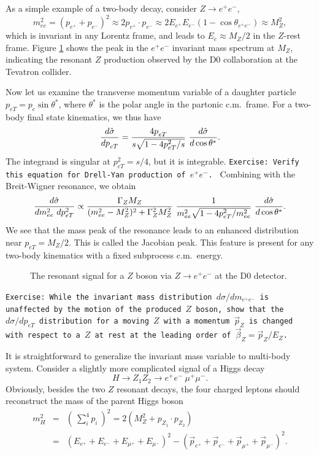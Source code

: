 \documentclass[12pt,prd,aps,floats,preprintnumbers,preprint,superscriptaddress,floatfix,nofootinbib]{revtex4}
\def\epem{e^+e^-}
\def\be{\begin{equation}}
\def\ee{\end{equation}}
\def\bea{\begin{eqnarray}}
\def\eea{\end{eqnarray}}
\begin{document}
As a simple example of a two-body decay, consider  $Z\to \epem$,
\be 
m_{ee}^2  = (p_{e^+} + p_{e^-})^2
\approx 2 p_{e^+} \cdot p_{e^-} \approx  2E_{e^+} E_{e^-} (1-\cos\theta_{\epem})
\approx M_Z^2,
\ee
which is invariant in any Lorentz frame, and leads to $E_e \approx M_Z/2$
in the $Z$-rest frame. Figure \ref{Zee} shows the peak 
in the $\epem$ invariant mass spectrum at $M_Z$, indicating the
resonant $Z$ production observed by the D0 collaboration \cite{d0} 
at the Tevatron collider.

Now let us examine the transverse momentum variable of a daughter
particle $p_{eT}^{}=p_e \sin\theta^*$, where $\theta^*$ is the polar angle
in the partonic c.m.~frame.  For a two-body final state kinematics, 
we thus have
\be
{d\hat\sigma\over dp_{eT}^{} } = {4p^{}_{eT} \over s \sqrt{1-4p_{eT}^2/s}}\ 
{d\hat\sigma\over d\cos\theta^* }.
\ee
The integrand is singular at  $p_{eT}^2 = s/4$, but it is integrable.
{
\vskip 0.2cm
\noindent
\tt Exercise: Verify this equation for  Drell-Yan production of $\epem$.
\vskip 0.2cm
}
\noindent
Combining with the Breit-Wigner resonance, we obtain
\be
{d\hat\sigma\over dm_{ee}^2\ dp_{eT}^2 } \propto
\frac{\Gamma_ZM_Z}{ (m^2_{ee}-M^2_Z)^2 + \Gamma_Z^2 M_Z^2}\ 
{1 \over m_{ee}^2\sqrt{1-4p_{eT}^2/m_{ee}^2}}\  {d\hat\sigma\over d\cos\theta^* }.
\ee
We see that the mass peak of the resonance leads to an enhanced
distribution near  $p_{eT}^{} = M_Z^{}/2$. This is called the Jacobian peak. 
This feature is present for any two-body kinematics with a fixed subprocess 
c.m.~energy. 

\begin{center}
\begin{figure}[tb]
\caption{The resonant signal for a $Z$ boson via $Z\to \epem$
at the D0 detector.}
\label{Zee}
\end{figure}
\end{center}

{
\vskip 0.2cm
\noindent
\tt Exercise: While the invariant mass distribution $d\sigma/dm_{\epem}$ is 
unaffected by the motion of the produced $Z$ boson, show that the 
$d\sigma/ dp_{eT}^{}$ distribution for a moving $Z$ with a momentum $\vec p_Z^{}$ is changed 
 with respect to a $Z$ at rest  at the leading order of $\vec \beta_Z^{} = \vec p_Z^{}/E_Z$.
\vskip 0.2cm
}

It is straightforward to generalize the invariant mass variable to multi-body
system. Consider a slightly more complicated signal of a Higgs decay
\be
H \to Z_1 Z_2 \to \epem\ \mu^+\mu^-.
\ee
Obviously, besides the two $Z$ resonant decays, the four charged
leptons should reconstruct the mass of the parent Higgs boson
\bea
m_H^2 &=& (\ \sum_i^4 p_{i} \ )^2 =  2 (M_Z^2 + p^{}_{Z_1} \cdot p^{}_{Z_2}) \\
 &=& (E_{e^+} + E_{e^-} + E_{\mu^+} + E_{\mu^-})^2
- (\vec p_{e^+} + \vec p_{e^-}  + \vec p_{\mu^+} + \vec p_{\mu^-})^2.
\label{Minv}
\eea
\end{document}
